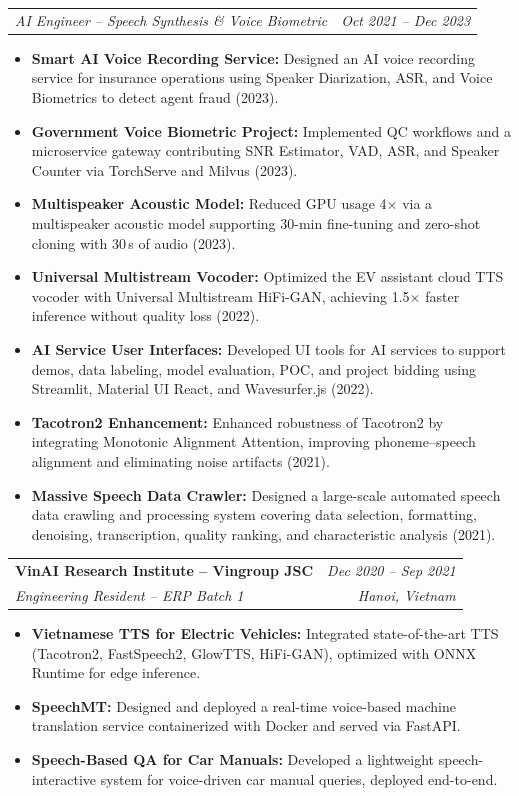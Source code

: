 \documentclass[10pt,a4paper]{article}
\makeatletter
\newcommand{\cventry}[4]{%
  \noindent
  \begin{tabular*}{\linewidth}{@{}l@{\extracolsep{\fill}}r@{}}
    {\color{accent}\textbf{#1}} & \textit{\small #2} \\
    \textit{\small #3} & \textit{\small #4}
  \end{tabular*}%
  \vspace{1pt}%
}
\newcommand{\cvsubrole}[2]{%
  \noindent
  \begin{tabular*}{\linewidth}{@{}l@{\extracolsep{\fill}}r@{}}
    \textit{\small #1} & \textit{\small #2}
  \end{tabular*}%
  \vspace{1pt}%
}
\makeatother
\begin{document}
\vspace{2pt}
\cvsubrole{AI Engineer -- Speech Synthesis \& Voice Biometric}{Oct 2021 -- Dec 2023}
\begin{itemize}
  \item \textbf{Smart AI Voice Recording Service:} Designed an AI voice recording service for insurance operations using Speaker Diarization, ASR, and Voice Biometrics to detect agent fraud (2023).
  \item \textbf{Government Voice Biometric Project:} Implemented QC workflows and a microservice gateway contributing SNR Estimator, VAD, ASR, and Speaker Counter via TorchServe and Milvus (2023).
  \item \textbf{Multispeaker Acoustic Model:} Reduced GPU usage 4$\times$ via a multispeaker acoustic model supporting 30-min fine-tuning and zero-shot cloning with 30\,s of audio (2023).
  \item \textbf{Universal Multistream Vocoder:} Optimized the EV assistant cloud TTS vocoder with Universal Multistream HiFi-GAN, achieving 1.5$\times$ faster inference without quality loss (2022).
  \item \textbf{AI Service User Interfaces:} Developed UI tools for AI services to support demos, data labeling, model evaluation, POC, and project bidding using Streamlit, Material UI React, and Wavesurfer.js (2022).
  \item \textbf{Tacotron2 Enhancement:} Enhanced robustness of Tacotron2 by integrating Monotonic Alignment Attention, improving phoneme--speech alignment and eliminating noise artifacts (2021).
  \item \textbf{Massive Speech Data Crawler:} Designed a large-scale automated speech data crawling and processing system covering data selection, formatting, denoising, transcription, quality ranking, and characteristic analysis (2021).
\end{itemize}

\vspace{4pt}

\cventry{VinAI Research Institute -- Vingroup JSC}{Dec 2020 -- Sep 2021}
        {Engineering Resident -- ERP Batch 1}{Hanoi, Vietnam}
\begin{itemize}
  \item \textbf{Vietnamese TTS for Electric Vehicles:} Integrated state-of-the-art TTS (Tacotron2, FastSpeech2, GlowTTS, HiFi-GAN), optimized with ONNX Runtime for edge inference.
  \item \textbf{SpeechMT:} Designed and deployed a real-time voice-based machine translation service containerized with Docker and served via FastAPI.
  \item \textbf{Speech-Based QA for Car Manuals:} Developed a lightweight speech-interactive system for voice-driven car manual queries, deployed end-to-end.
\end{itemize}
\end{document}

